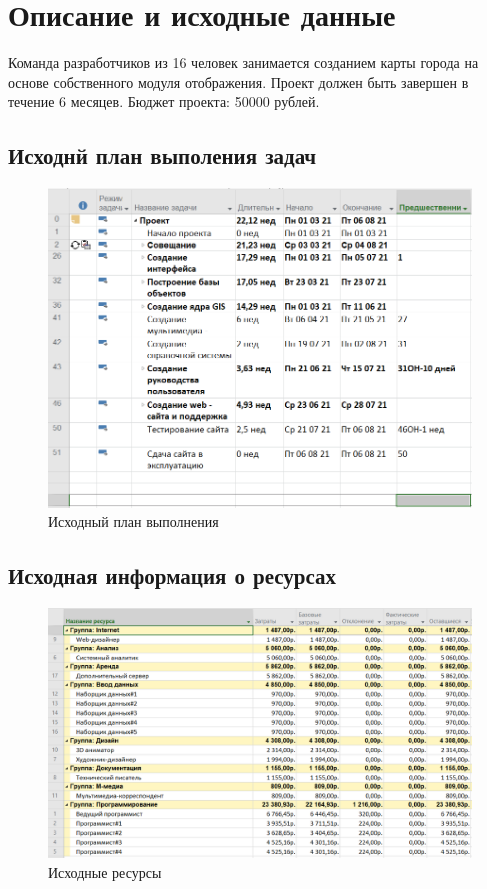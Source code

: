 \section{Описание и исходные данные}
Команда разработчиков из 16 человек занимается созданием карты города на основе собственного модуля отображения. 
Проект должен быть завершен в течение 6 месяцев. 
Бюджет проекта: 50000 рублей.

\subsection{Исходнй план выполения задач}
\begin{figure}[H]
	\centering
	\includegraphics[width=0.7\linewidth]{src/1}
	\caption{Исходный план выполнения}
	\label{fig:1}
\end{figure}

\subsection{Исходная информация о ресурсах}
\begin{figure}[H]
	\centering
	\includegraphics[width=0.7\linewidth]{src/2}
	\caption{Исходные ресурсы}
	\label{fig:2}
\end{figure}

